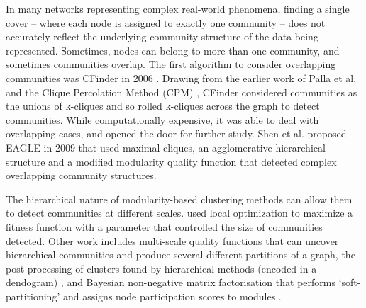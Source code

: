 \documentclass{report}
\begin{document}
	In many networks representing complex real-world phenomena, finding a single cover -- where each node is assigned to exactly one community -- does not accurately reflect the underlying community structure of the data being represented. Sometimes, nodes can belong to more than one community, and sometimes communities overlap. The first algorithm to consider overlapping communities was CFinder in 2006 \cite{adamcsek2006cfinder}. Drawing from the earlier work of Palla et al. and the Clique Percolation Method (CPM) \cite{palla2005uncovering}, CFinder considered communities as the unions of k-cliques and so rolled k-cliques across the graph to detect communities. While computationally expensive, it was able to deal with overlapping cases, and opened the door for further study. Shen et al. proposed EAGLE in 2009 \cite{shen2009detect} that used maximal cliques, an agglomerative hierarchical structure and a modified modularity quality function that detected complex overlapping community structures.
	
	The hierarchical nature of modularity-based clustering methods can allow them to detect communities at different scales. 
	\cite{lancichinetti2009detecting} used local optimization to maximize a fitness function with a parameter that controlled the size of communities detected.
	Other work includes multi-scale quality functions that can uncover hierarchical communities and produce several different partitions of a graph, the post-processing of clusters found by hierarchical methods (encoded in a dendogram) \cite{pons2011post}, and Bayesian non-negative matrix factorisation that performs `soft-partitioning' and assigns node participation scores to modules \cite{psorakis2011overlapping}.
	
	
	
\end{document}
